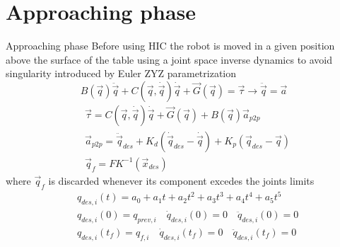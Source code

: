 \section{Approaching phase}
\begin{frame}[shrink=10]{Approaching phase}
  Before using HIC the robot is moved in a given position above the surface of the table using a joint space inverse dynamics
  to avoid singularity introduced by Euler ZYZ parametrization
  \[
  B(\vec{q}) \ddot{\vec{q}} + C(\vec{q}, \dot{\vec{q}}) \dot{\vec{q}} + \vec{G}(\vec{q}) = \vec{\tau}
  \longrightarrow \ddot{\vec{q}} = \vec{a}
  \]
  \[
  \begin{split}
    &\vec{\tau} = C(\vec{q}, \dot{\vec{q}}) \dot{\vec{q}} + \vec{G}(\vec{q})  +  B(\vec{q}) \vec{a}_{p2p}\\
    &\vec{a}_{p2p} = \ddot{\vec{q}}_{des} + K_d(\dot{\vec{q}}_{des} - \dot{\vec{q}}) + K_p(\vec{q}_{des} - \vec{q})\\
    &\vec{q}_{f} = FK^{-1}(\vec{x}_{des})
  \end{split}
  \]
  where $\vec{q}_f$ is discarded whenever its component excedes the joints limits
  \[
  \begin{split}
    &q_{des, i}(t) = a_0 + a_1 t + a_2 t^2 + a_3 t^3 + a_4 t^4 + a_5 t^5\\
    &q_{des, i}(0) = q_{prev,i} \quad \dot{q}_{des, i}(0) = 0 \quad \ddot{q}_{des, i}(0) = 0\\
    &q_{des, i}(t_f) = q_{f,i} \quad \dot{q}_{des, i}(t_f) = 0 \quad \ddot{q}_{des, i}(t_f) = 0
  \end{split}
  \]
\end{frame}
